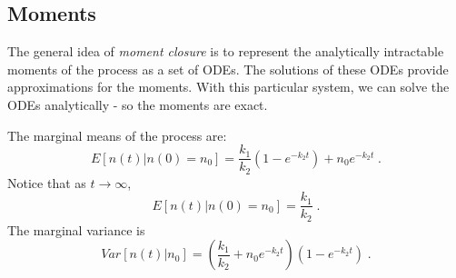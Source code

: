 \documentclass{pnastwo}
\begin{document}
\begin{article}
\subsection{Moments}

The general idea of \textit{moment closure} is to represent the analytically intractable moments of the process as a set of ODEs. The solutions of these ODEs provide approximations for the moments. With this particular system, we can solve the ODEs analytically - so the moments are exact.

The marginal means of the process are:
\[
E[n(t) | n(0) = n_0 ] = \frac{k_1}{k_2}(1-e^{-k_2 t}) + n_0 e^{-k_2 t} \;.
\]
Notice that as $t \rightarrow \infty$,
\[
E[n(t) | n(0) = n_0 ] = \frac{k_1}{k_2} \;.
\]
The marginal variance is
\[
Var[n(t) | n_0]  = \left(\frac{k_1}{k_2} + n_0e^{-k_2 t}\right)(1-e^{-k_2 t}) \;.
\]





\end{article}
\end{document}
